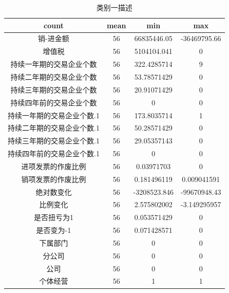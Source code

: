 \documentclass[UTF8]{ctexart}
\begin{document}
\newpage
\begin{center}
	\begin{longtable}{|c|c|c|c|}
		\caption{类别一描述}
		\label{tab:aaa}                                                 \\
		\hline
		count                      & mean & min          & max          \\ \hline
		销-进金额                  & 56   & 66835446.05  & -36469795.66 \\ \hline
		增值税                     & 56   & 5104104.041  & 0            \\ \hline
		持续一年期的交易企业个数   & 56   & 322.4285714  & 9            \\ \hline
		持续二年期的交易企业个数   & 56   & 53.78571429  & 0            \\ \hline
		持续三年期的交易企业个数   & 56   & 20.91071429  & 0            \\ \hline
		持续四年前的交易企业个数   & 56   & 0            & 0            \\ \hline
		持续一年期的交易企业个数.1 & 56   & 173.8035714  & 1            \\ \hline
		持续二年期的交易企业个数.1 & 56   & 50.28571429  & 0            \\ \hline
		持续三年期的交易企业个数.1 & 56   & 29.05357143  & 0            \\ \hline
		持续四年前的交易企业个数.1 & 56   & 0            & 0            \\ \hline
		进项发票的作废比例         & 56   & 0.03971703   & 0            \\ \hline
		销项发票的作废比例         & 56   & 0.181496119  & 0.009041591  \\ \hline
		绝对数变化                 & 56   & -3208523.846 & -99670948.43 \\ \hline
		比例变化                   & 56   & 2.575802002  & -3.149295957 \\ \hline
		是否扭亏为1                & 56   & 0.053571429  & 0            \\ \hline
		是否变为-1                 & 56   & 0.071428571  & 0            \\ \hline
		下属部门                   & 56   & 0            & 0            \\ \hline
		分公司                     & 56   & 0            & 0            \\ \hline
		公司                       & 56   & 0            & 0            \\ \hline
		个体经营                   & 56   & 1            & 1            \\ \hline

\end{longtable}
\end{center}
\end{document}

